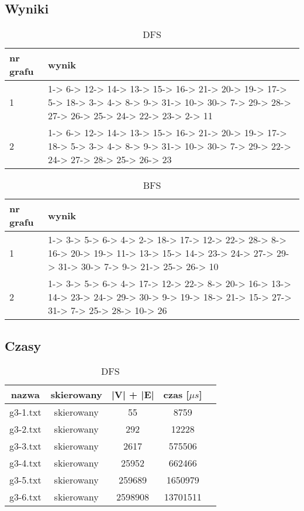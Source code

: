 \documentclass[12pt, letterpaper]{article}
\begin{document}
\subsection{Wyniki}

\begin{table}[H]\centering
    \caption{DFS}
    \begin{tabular}{|p{1cm}|p{10cm}|}\hline
        nr grafu & wynik
        \\\hline
        1        & 1-> 6-> 12-> 14-> 13-> 15-> 16-> 21-> 20-> 19-> 17-> 5->
        18-> 3->
        4-> 8-> 9-> 31-> 10-> 30-> 7-> 29-> 28-> 27-> 26-> 25-> 24-> 22-> 23->
        2-> 11
        \\\hline
        2        & 1-> 6-> 12-> 14-> 13-> 15-> 16-> 21-> 20-> 19-> 17-> 18->
        5-> 3->
        4-> 8-> 9-> 31-> 10-> 30-> 7-> 29-> 22-> 24-> 27-> 28-> 25-> 26-> 23
        \\\hline
    \end{tabular}
\end{table}

\begin{table}[H]\centering
    \caption{BFS}
    \begin{tabular}{|p{1cm}|p{10cm}|}\hline
        nr grafu & wynik
        \\\hline
        1        & 1-> 3-> 5-> 6-> 4-> 2-> 18-> 17-> 12-> 22-> 28-> 8-> 16->
        20-> 19-> 11-> 13-> 15-> 14-> 23-> 24-> 27-> 29-> 31-> 30-> 7-> 9->
        21-> 25->
        26-> 10
        \\\hline
        2        & 1-> 3-> 5-> 6-> 4-> 17-> 12-> 22-> 8-> 20-> 16-> 13-> 14->
        23-> 24-> 29-> 30-> 9-> 19-> 18-> 21-> 15-> 27-> 31-> 7-> 25-> 28->
        10-> 26
        \\\hline
    \end{tabular}
\end{table}

\subsection{Czasy}

\begin{table}[H]\centering
    \caption{DFS}
    \begin{tabular}{|c|c|c|c|c|}\hline
        nazwa    & skierowany & |V| + |E| & czas [$\mu s$] \\\hline
        g3-1.txt & skierowany & 55        & 8759      \\\hline
        g3-2.txt & skierowany & 292       & 12228     \\\hline
        g3-3.txt & skierowany & 2617      & 575506    \\\hline
        g3-4.txt & skierowany & 25952     & 662466    \\\hline
        g3-5.txt & skierowany & 259689    & 1650979   \\\hline
        g3-6.txt & skierowany & 2598908   & 13701511  \\\hline
    \end{tabular}
\end{table}
\end{document}
